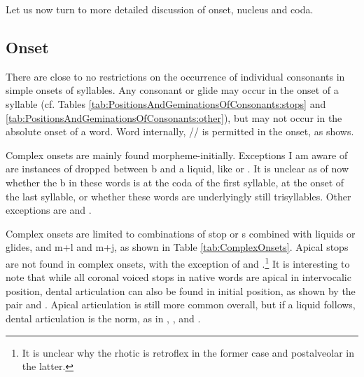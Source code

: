 

Let us now turn to more detailed discussion of onset, nucleus and coda.

\subsection{Onset}\label{sec:phon:Onset}
There are close to no restrictions on the occurrence of individual consonants in simple onsets of syllables. Any consonant or glide may occur in the onset of a syllable (cf. Tables \ref{tab:PositionsAndGeminationsOfConsonants:stops} and \ref{tab:PositionsAndGeminationsOfConsonants:other}), but  may not occur in the absolute onset of a word.
Word internally, /\ng/ is permitted in the onset, as  shows.

Complex onsets are mainly found morpheme-initially. Exceptions I am aware of are instances of \E{} dropped between b and a liquid, like  or . It is unclear as of now whether the b in these words is at the coda of the first syllable, at the onset of the last syllable, or whether these words are underlyingly still trisyllables. Other exceptions are   and .

Complex onsets are limited to  combinations of stop or s combined with liquids or glides,  and m+l and m+j, as shown in Table \ref{tab:ComplexOnsets}. Apical stops are not found in complex onsets, with the exception of  and .\footnote{It is unclear why the rhotic is retroflex in the former case and postalveolar in the latter.} It is interesting to note that while all coronal voiced stops in native words are apical in intervocalic position, dental articulation can also be found in initial position, as shown by the pair  and . Apical articulation is still more common overall, but if a liquid follows, dental articulation is the norm, as in , , and  .

